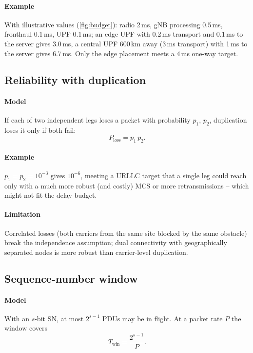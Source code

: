 \documentclass[11pt,a4paper]{article}
\begin{document}
\paragraph{Example} With illustrative values (\cref{fig:budget}): radio 2\,ms, gNB processing 0.5\,ms, fronthaul 0.1\,ms, UPF 0.1\,ms; an edge UPF with 0.2\,ms
transport and 0.1\,ms to the server gives 3.0\,ms, a central UPF 600\,km away (3\,ms transport) with 1\,ms to the server gives 6.7\,ms. Only the edge
placement meets a 4\,ms one-way target.

\begin{acnfigure}
  \caption{One-way user-plane latency budget with edge and central UPF (illustrative values, \cref{eq:budget}).}
  \label{fig:budget}
\end{acnfigure}

\subsection{Reliability with duplication}\label{sec:dup}
\paragraph{Model} If each of two independent legs loses a packet with probability $p_1$, $p_2$, duplication loses it only if both fail:
\begin{equation}\label{eq:dup}
  P_{\mathrm{loss}} = p_1\,p_2 .
\end{equation}
\paragraph{Example} $p_1 = p_2 = 10^{-3}$ gives $10^{-6}$, meeting a URLLC target that a single leg could reach only with a much more robust (and costly)
MCS or more retransmissions -- which might not fit the delay budget.
\paragraph{Limitation} Correlated losses (both carriers from the same site blocked by the same obstacle) break the independence assumption; dual
connectivity with geographically separated nodes is more robust than carrier-level duplication.

\subsection{Sequence-number window}\label{sec:sn}
\paragraph{Model} With an $s$-bit SN, at most $2^{s-1}$ PDUs may be in flight. At a packet rate $P$ the window covers
\begin{equation}\label{eq:window}
  T_{\mathrm{win}} = \frac{2^{s-1}}{P} .
\end{equation}
\end{document}
